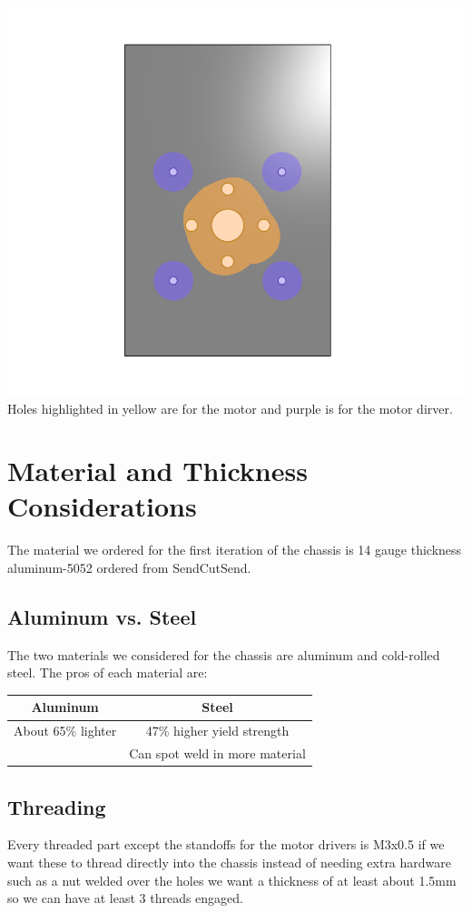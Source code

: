 \documentclass{iopart}
\begin{document}
\begin{center}
    \includegraphics{graphics/motor_mount.png}\\
    Holes highlighted in yellow are for the motor and purple is for the motor dirver.
\end{center}

\section{Material and Thickness Considerations}
The material we ordered for the first iteration of the chassis is 14 gauge thickness aluminum-5052 ordered from SendCutSend.

\subsection{Aluminum vs. Steel}
The two materials we considered for the chassis are aluminum and cold-rolled steel. The pros of each material are:

\begin{center}
    \begin{tabular}{c|c}
        Aluminum & Steel \\
        \hline
        About 65\% lighter & 47\% higher yield strength \\
         & Can spot weld in more material
    \end{tabular}
\end{center}

\subsection{Threading}
Every threaded part except the standoffs for the motor drivers is M3x0.5 if we want these to thread directly into the chassis instead of needing extra hardware such as a nut welded over the holes we want a thickness of at least about 1.5mm so we can have at least 3 threads engaged.
\end{document}
